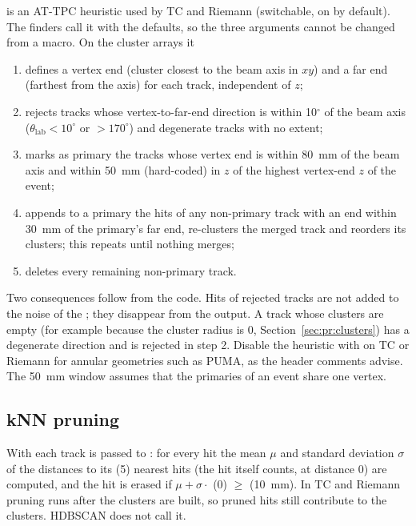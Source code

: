  is an AT-TPC
heuristic used by TC and Riemann (switchable, on by default). The finders call it with the defaults, so
the three arguments cannot be changed from a macro. On the cluster arrays it
\begin{enumerate}
\item defines a vertex end (cluster closest to the beam axis in $xy$) and a far end (farthest from the
  axis) for each track, independent of $z$;
\item rejects tracks whose vertex-to-far-end direction is within 10$^\circ$ of the beam axis
  ($\theta_\mathrm{lab}<10^\circ$ or $>170^\circ$) and degenerate tracks with no extent;
\item marks as primary the tracks whose vertex end is within 80~mm of the beam axis and within 50~mm
  (hard-coded) in $z$ of the highest vertex-end $z$ of the event;
\item appends to a primary the hits of any non-primary track with an end within 30~mm of the primary's far
  end, re-clusters the merged track and reorders its clusters; this repeats until nothing merges;
\item deletes every remaining non-primary track.
\end{enumerate}
Two consequences follow from the code. Hits of rejected tracks are not added to the noise of the
; they disappear from the output. A track whose clusters are empty (for example
because the cluster radius is 0, Section~\ref{sec:pr:clusters}) has a degenerate direction and is rejected
in step 2. Disable the heuristic with  on TC or Riemann for annular geometries
such as PUMA, as the header comments advise. The 50~mm window assumes that the primaries of an event
share one vertex.

\subsection{kNN pruning}

With  each track is passed to : for every hit the mean $\mu$ and
standard deviation $\sigma$ of the distances to its  (5) nearest hits (the hit itself counts, at distance 0) are computed, and the
hit is erased if $\mu + \sigma\cdot$ (0) $\geq$  (10~mm). In TC
and Riemann pruning runs after the clusters are built, so pruned hits still contribute to the clusters.
HDBSCAN does not call it.

